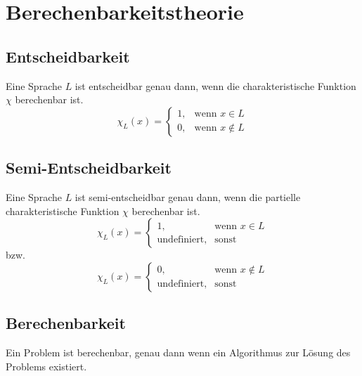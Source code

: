 \documentclass{article}
\begin{document}
\section{Berechenbarkeitstheorie}
\subsection{Entscheidbarkeit}
Eine Sprache $L$ ist entscheidbar genau dann, wenn die charakteristische Funktion $\chi$ berechenbar ist.
\begin{equation}
    \chi _L(x)=
    \begin{cases}
        1, & \text{wenn } x\in L     \\
        0, & \text{wenn } x\not\in L
    \end{cases}
\end{equation}
\subsection{Semi-Entscheidbarkeit}
Eine Sprache $L$ ist semi-entscheidbar genau dann, wenn die partielle charakteristische Funktion $\chi$ berechenbar ist.
\begin{equation}
    \chi _L(x)=
    \begin{cases}
        1,                  & \text{wenn } x\in L \\
        \text{undefiniert}, & \text{sonst}
    \end{cases}
\end{equation}
bzw.
\begin{equation}
    \chi _L(x)=
    \begin{cases}
        0,                  & \text{wenn } x\not\in L \\
        \text{undefiniert}, & \text{sonst}
    \end{cases}
\end{equation}
\subsection{Berechenbarkeit}
Ein Problem ist berechenbar, genau dann wenn ein Algorithmus zur Lösung des Problems existiert.
\end{document}
